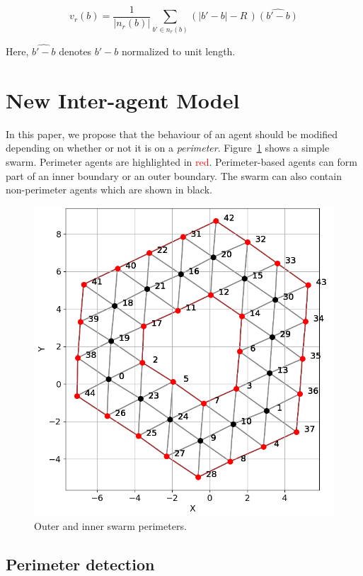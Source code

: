 \documentclass[12pt,a4paper]{IEEEtran}
\newcommand{\card}[1]{\vert{#1}\vert}
\newcommand{\vbb}[2]{#2-#1}
\begin{document}
\begin{equation}\label{eq:repulsion2a}
v_r(b) = \frac{1}{\card{n_r(b)}}\sum_{b' \in n_r(b)} \left(\card{\vbb{b}{b'}} - R \, \right)\widehat{\left(\vbb{b}{b'}\right)}
\end{equation}

Here, $\widehat{\vbb{b}{b'}}$ denotes $\vbb{b}{b'}$ normalized to unit length.

\section{New Inter-agent Model}
In this paper, we propose that the behaviour of an agent should be modified depending on whether or not it is on a \emph{perimeter}. Figure~\ref{fig:simplePerim2} shows a simple swarm. Perimeter agents are highlighted in \textcolor{red}{red}. Perimeter-based agents can form part of an inner boundary or an outer boundary. The swarm can also contain non-perimeter agents which are shown in black.

\begin{figure}[H]
	\begin{center}
		\includegraphics[width=0.8\linewidth]{figures/relationships2}
	\end{center}
	\caption{Outer and inner swarm perimeters. \label{fig:simplePerim2}}
\end{figure}

\subsection{Perimeter detection}\label{sec:perimeterDetection} 
\end{document}
